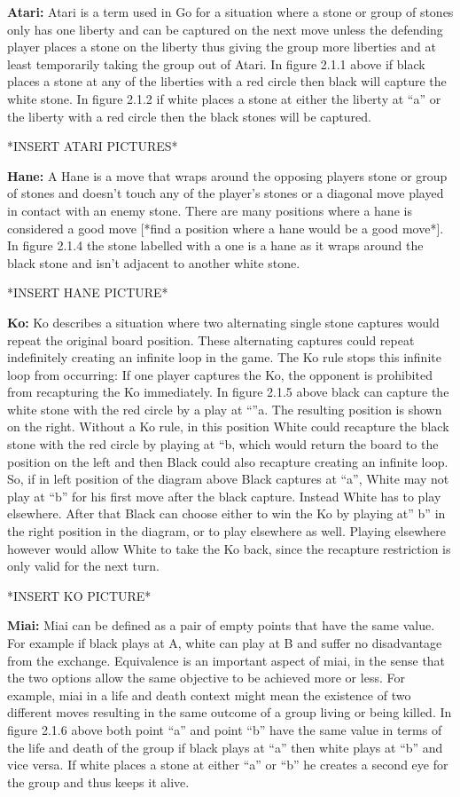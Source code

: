 \documentclass{l3proj}
\begin{document}
\textbf{Atari:} Atari is a term used in Go for a situation where a stone or group of stones only has one liberty and can be captured on the next move unless the defending player places a stone on the liberty thus giving the group more liberties and at least temporarily taking the group out of Atari. In figure 2.1.1 above if black places a stone at any of the liberties with a red circle then black will capture the white stone. In figure 2.1.2 if white places a stone at either the liberty at “a” or the liberty with a red circle then the black stones will be captured.

*INSERT ATARI PICTURES*

\textbf{Hane:} A Hane is a move that wraps around the opposing players stone or group of stones and doesn’t touch any of the player’s stones or a diagonal move played in contact with an enemy stone. There are many positions where a hane is considered a good move [*find a position where a hane would be a good move*]. In figure 2.1.4 the stone labelled with a one is a hane as it wraps around the black stone and isn’t adjacent to another white stone.

*INSERT HANE PICTURE*

\textbf{Ko:} Ko describes a situation where two alternating single stone captures would repeat the original board position. These alternating captures could repeat indefinitely creating an infinite loop in the game. The Ko rule stops this infinite loop from occurring: If one player captures the Ko, the opponent is prohibited from recapturing the Ko immediately. In figure 2.1.5 above black can capture the white stone with the red circle by a play at “”a. The resulting position is shown on the right. Without a Ko rule, in this position White could recapture the black stone with the red circle by playing at “b, which would return the board to the position on the left and then Black could also recapture creating an infinite loop. So, if in left position of the diagram above Black captures at “a”, White may not play at “b” for his first move after the black capture. Instead White has to play elsewhere. After that Black can choose either to win the Ko by playing at” b” in the right position in the diagram, or to play elsewhere as well. Playing elsewhere however would allow White to take the Ko back, since the recapture restriction is only valid for the next turn.

*INSERT KO PICTURE*

\textbf{Miai:} Miai can be defined as a pair of empty points that have the same value. For example if black plays at A, white can play at B and suffer no disadvantage from the exchange. Equivalence is an important aspect of miai, in the sense that the two options allow the same objective to be achieved more or less. For example, miai in a life and death context might mean the existence of two different moves resulting in the same outcome of a group living or being killed. In figure 2.1.6 above both point “a” and point “b” have the same value in terms of the life and death of the group if black plays at “a” then white plays at “b” and vice versa. If white places a stone at either “a” or “b” he creates a second eye for the group and thus keeps it alive.
\end{document}
